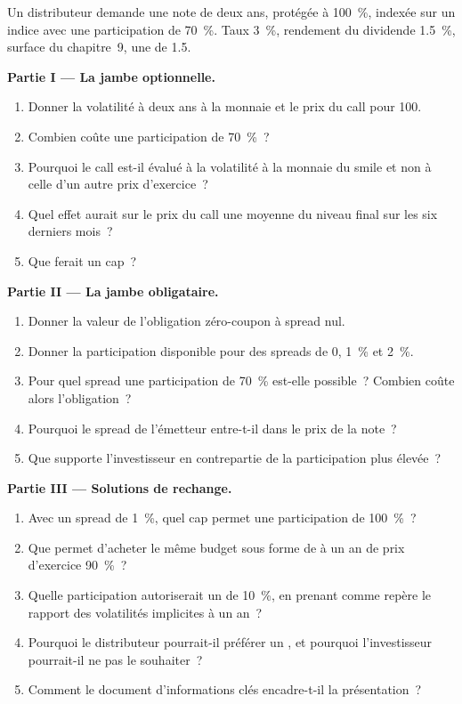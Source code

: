 \begin{problem}\label{pb:dv:the-structured-products-business:1}
Un distributeur demande une note de deux ans, protégée à 100~\%, indexée sur un indice avec une participation de 70~\%. Taux 3~\%, rendement du dividende 1.5~\%, surface du chapitre~9,
une  de 1.5.

\medskip\noindent\textbf{Partie I --- La jambe optionnelle.}
\begin{enumerate}
\item Donner la volatilité à deux ans à la monnaie et le prix du call pour 100.
\item Combien coûte une participation de 70~\%~?
\item Pourquoi le call est-il évalué à la volatilité à la monnaie du smile et non à celle d'un autre prix d'exercice~?
\item Quel effet aurait sur le prix du call une moyenne du niveau final sur les six derniers mois~?
\item Que ferait un cap~?
\end{enumerate}

\medskip\noindent\textbf{Partie II --- La jambe obligataire.}
\begin{enumerate}[resume]
\item Donner la valeur de l'obligation zéro-coupon à spread nul.
\item Donner la participation disponible pour des spreads de 0, 1~\% et 2~\%.
\item Pour quel spread une participation de 70~\% est-elle possible~? Combien coûte alors l'obligation~?
\item Pourquoi le spread de l'émetteur entre-t-il dans le prix de la note~?
\item Que supporte l'investisseur en contrepartie de la participation plus élevée~?
\end{enumerate}

\medskip\noindent\textbf{Partie III --- Solutions de rechange.}
\begin{enumerate}[resume]
\item Avec un spread de 1~\%, quel cap permet une participation de 100~\%~?
\item Que permet d'acheter le même budget sous forme de  à un an de prix d'exercice 90~\%~?
\item Quelle participation autoriserait un  de 10~\%, en prenant comme repère le rapport des volatilités implicites à un an~?
\item Pourquoi le distributeur pourrait-il préférer un , et pourquoi l'investisseur pourrait-il ne pas le souhaiter~?
\item Comment le document d'informations clés encadre-t-il la présentation~?
\end{enumerate}


\end{problem}
